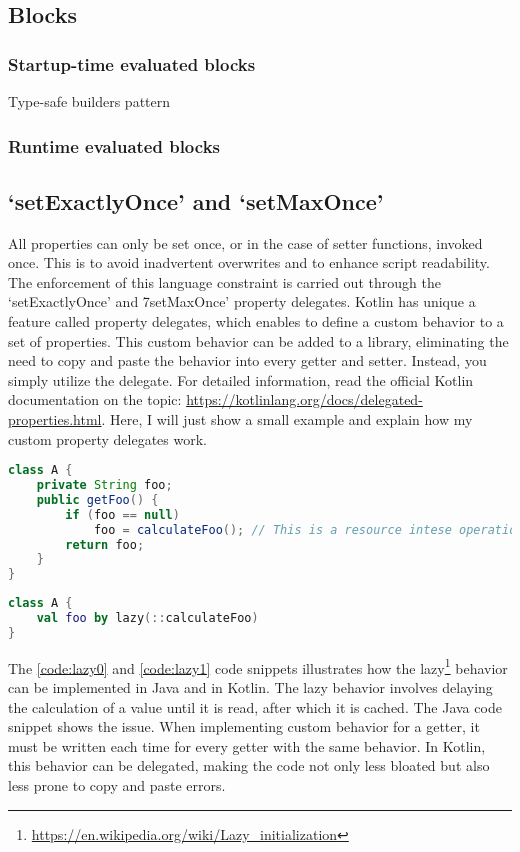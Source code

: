 \subsection{Blocks}

\subsubsection{Startup-time evaluated blocks}

Type-safe builders pattern

\subsubsection{Runtime evaluated blocks}

\subsection{`setExactlyOnce' and `setMaxOnce'}

All properties can only be set once, or in the case of setter functions, invoked once. This is to avoid inadvertent overwrites and to enhance script readability. The enforcement of this language constraint is carried out through the `setExactlyOnce' and 7setMaxOnce' property delegates. Kotlin has unique a feature called property delegates, which enables to define a custom behavior to a set of properties. This custom behavior can be added to a library, eliminating the need to copy and paste the behavior into every getter and setter. Instead, you simply utilize the delegate. For detailed information, read the official Kotlin documentation on the topic: \url{https://kotlinlang.org/docs/delegated-properties.html}. Here, I will just show a small example and explain how my custom property delegates work.

\begin{lstlisting}[caption={Lazy getter in Java},language=Java,label=code:lazy0]
class A {
    private String foo;
    public getFoo() {
        if (foo == null) 
            foo = calculateFoo(); // This is a resource intese operation
        return foo;
    }
}
\end{lstlisting}
    
\begin{lstlisting}[caption={Lazy property in Kotlin},language=Kotlin,label=code:lazy1]
class A {
    val foo by lazy(::calculateFoo)
}
\end{lstlisting}

The \ref{code:lazy0} and \ref{code:lazy1} code snippets illustrates how the lazy\footnote{\url{https://en.wikipedia.org/wiki/Lazy_initialization}} behavior can be implemented in Java and in Kotlin. The lazy behavior involves delaying the calculation of a value until it is read, after which it is cached. The Java code snippet shows the issue. When implementing custom behavior for a getter, it must be written each time for every getter with the same behavior. In Kotlin, this behavior can be delegated, making the code not only less bloated but also less prone to copy and paste errors.

